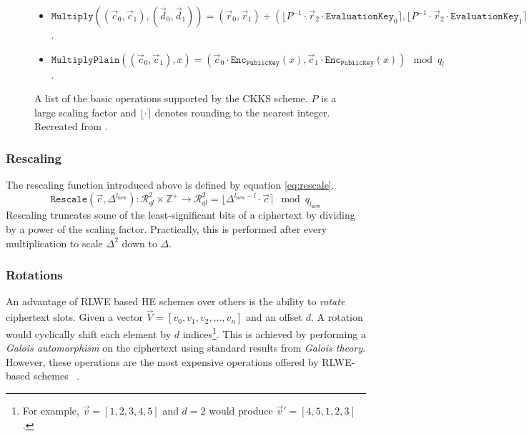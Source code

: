 \begin{figure}[h!]
{\begin{tcolorbox}
\begin{itemize}[leftmargin=0.1cm]
            \item $\texttt{Multiply}((\vec{c}_0, \vec{c}_1), (\vec{d}_0, \vec{d}_1)) = (\vec{r}_0, \vec{r}_1) + (\lfloor P^{-1} \cdot \vec{r}_2 \cdot \texttt{EvaluationKey}_0 \rceil, \lfloor P^{-1} \cdot \vec{r}_2 \cdot \texttt{EvaluationKey}_1  \rceil) \mod q_l$.
            \item $\texttt{MultiplyPlain}((\vec{c}_0, \vec{c}_1), x) = (\vec{c}_0 \cdot \texttt{Enc}_\texttt{PublicKey}(x), \vec{c}_1 \cdot \texttt{Enc}_\texttt{PublicKey}(x)) \mod q_l$.
        \end{itemize}
    \end{tcolorbox}}
    \caption[CKKS Operations]{A list of the basic operations supported by the CKKS scheme. $P$ is a large scaling factor and $\lfloor \cdot \rceil$ denotes rounding to the nearest integer. Recreated from \cite{CKKS}.}
    \label{fig:ckksOps}
\end{figure}
\subsubsection{Rescaling}
\indent \indent
The rescaling function introduced above is defined by equation \ref{eq:rescale}.
\begin{equation}
    \label{eq:rescale}
    \texttt{Rescale}(\vec{c}, \Delta^{l_\text{new}}) : \mathcal{R}^2_{ql} \times \mathbb{Z}^+ \rightarrow \mathcal{R}^2_{ql} = \lfloor \Delta^{l_\text{new} - l} \cdot \vec{c} \rceil \mod q_{l_\text{new}}
\end{equation}
\indent
Rescaling truncates some of the least-significant bits of a ciphertext by dividing by a power of the scaling factor. Practically, this is performed after every multiplication to scale $\Delta^2$ down to $\Delta$.
\subsubsection{Rotations}
\indent \indent
An advantage of RLWE based HE schemes over others is the ability to \textit{rotate} ciphertext slots. Given a vector $\vec{V} = [v_0, v_1, v_2, \ldots, v_n]$ and an offset $d$. A rotation would cyclically shift each element by $d$ indices\footnote{For example, $\vec{v} = [1, 2, 3, 4, 5]$ and $d = 2$ would produce $\vec{v}' = [4, 5, 1, 2, 3]$.}. This is achieved by performing a \textit{Galois automorphism} on the ciphertext using standard results from \textit{Galois theory}. However, these operations are the most expensive operations offered by RLWE-based schemes  ~\cite{RotationBad}.
